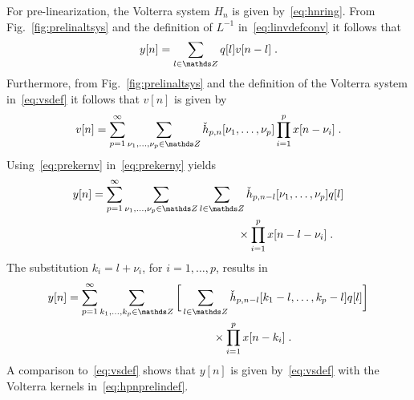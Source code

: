 \documentclass[10pt,twocolumn,twoside]{IEEEtran}
\begin{document}
For pre-linearization, the Volterra system $H_n$ is given by~\eqref{eq:hnring}.
From Fig.~\ref{fig:prelinaltsys} and the definition of $L^{-1}$ in~\eqref{eq:linvdefconv}
it follows that
\begin{align}
	y[n] = \sum_{l\in\Z} q[l] v[n-l]\;.
	\label{eq:prekerny}
\end{align}
Furthermore, from Fig.~\ref{fig:prelinaltsys} and the definition of the Volterra
system in~\eqref{eq:vsdef} it follows that $v[n]$ is given by
\begin{align}
	v[n]
		= \sum_{p=1}^\infty \sum_{\nu_1,\dots,\nu_p\in\Z} \check{h}_{p,n}[\nu_1,\dots,\nu_p]\prod_{i=1}^p x[n-\nu_i]\;.
	\label{eq:prekernv}
\end{align}
Using~\eqref{eq:prekernv} in~\eqref{eq:prekerny} yields
\begin{align*}
	y[n] &= \sum_{p=1}^\infty \sum_{\nu_1,\dots,\nu_p\in\Z} \sum_{l\in\Z}
				\check{h}_{p,n-l}[\nu_1,\dots,\nu_p] q[l] \\
				&\qquad\qquad\qquad\qquad\qquad\qquad\quad\times
				\prod_{i=1}^p x[n-l-\nu_i]\;.
\end{align*}
The substitution $k_i=l+\nu_i$, for $i=1,\ldots,p$, results in
\begin{align*}
	y[n]
		&= \sum_{p=1}^\infty \sum_{k_1,\dots,k_p\in\Z} \bigg[ \sum_{l\in\Z}
				\check{h}_{p,n-l}[k_1-l,\dots,k_p-l] q[l] \bigg] \\
				&\qquad\qquad\qquad\qquad\qquad\qquad\quad\times
				\prod_{i=1}^p x[n-k_i]\;.
\end{align*}
A comparison to~\eqref{eq:vsdef} shows that $y[n]$ is given by~\eqref{eq:vsdef}
with the Volterra kernels in~\eqref{eq:hpnprelindef}.





\vspace*{3em}
\end{document}
